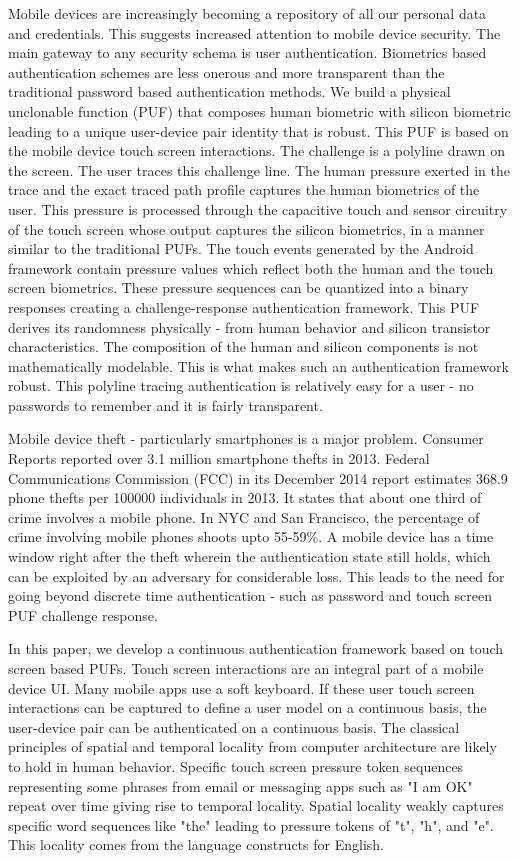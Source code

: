 \documentclass{acm_proc_article-sp}
\begin{document}
Mobile devices are increasingly becoming a repository of all our personal data and credentials.
This suggests increased attention to mobile device security. The main gateway to any security
schema is user authentication. Biometrics based authentication schemes are less onerous and 
more transparent than the traditional password based authentication methods. We \cite{ScheelTyagi15} build 
a physical unclonable function (PUF) that composes human biometric with silicon biometric
leading to a unique user-device pair identity that is robust. This PUF is based on the mobile
device touch screen interactions. The challenge is a polyline drawn on the screen. The user
traces this challenge line. The human pressure exerted in the trace and the exact traced path
profile captures the human biometrics of the user. This pressure is
processed through the capacitive touch
and sensor circuitry of the touch screen whose output captures the silicon biometrics, in a 
manner similar to the traditional PUFs. The touch events generated by the Android framework
contain pressure values which reflect both the human and the touch screen biometrics.
These pressure sequences can be quantized into a binary responses creating a challenge-response
authentication framework. This PUF derives its randomness physically - from human behavior and silicon
transistor characteristics. The composition of the human and silicon components is not mathematically
modelable. This is what makes such an authentication framework robust. This polyline tracing authentication is relatively easy for a user - no passwords to remember
and it is fairly transparent.
 

Mobile device theft - particularly smartphones is a major problem. Consumer Reports \cite{CR14}
reported over 3.1 million smartphone thefts in 2013. Federal Communications Commission (FCC)
\cite{FCC14}
in its December 2014 report estimates 368.9 phone thefts per 100000 individuals in 2013. It states 
that about one third of crime involves a mobile phone. In NYC and San Francisco, the percentage
of crime involving mobile phones shoots upto 55-59\%. A mobile device has a time window right after
the theft wherein the authentication state still holds, which can be exploited by an adversary for considerable loss. This leads to the need for going beyond discrete time authentication - such as
password and touch screen PUF challenge response.

In this paper, we develop a continuous authentication framework based on touch screen based PUFs.
Touch screen interactions are an integral part of a mobile device UI. Many mobile apps use a soft keyboard. 
 If these user touch screen interactions can be captured to define a 
user model on a continuous basis, the user-device pair can be authenticated on a continuous
basis. The classical principles of spatial and temporal locality from computer architecture
are likely to hold in human behavior. Specific touch screen pressure token sequences representing
some phrases from email or messaging apps such as "I am OK" repeat over time giving rise
to temporal locality. Spatial locality weakly captures specific word sequences like "the" 
leading to pressure tokens of "t", "h", and "e". This locality comes from the language constructs for
English.
\end{document}

